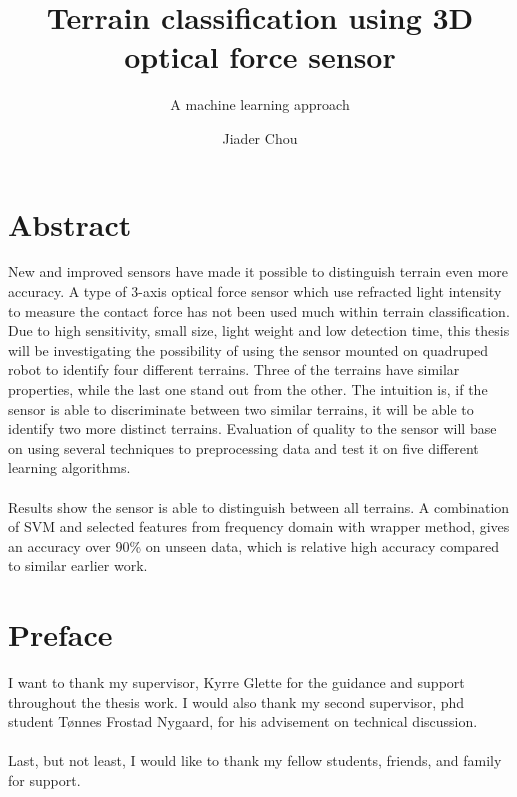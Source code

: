 \documentclass[USenglish]{ifimaster}  %
\title{Terrain classification using 3D optical force sensor}        %
\subtitle{A machine learning approach}
\author{Jiader Chou}                      %
\begin{document}
	\ififorside{}
	\frontmatter{}
	\maketitle{}
	
	\frontmatter{}
\chapter*{Abstract}                   %
New and improved sensors have made it possible to distinguish terrain even more accuracy. A type of 3-axis optical force sensor which use refracted light intensity to measure the contact force has not been used much within terrain classification. Due to high sensitivity, small size, light weight and low detection time, this thesis will be investigating the possibility of using the sensor mounted on quadruped robot to identify four different terrains. Three of the terrains have similar properties, while the last one stand out from the other. The intuition is, if the sensor is able to discriminate between two similar terrains, it will be able to identify two more distinct terrains. Evaluation of quality to the sensor will base on using several techniques to preprocessing data and test it on five different learning algorithms.
\\
\\
Results show the sensor is able to distinguish between all terrains. A combination of SVM and selected features from frequency domain with wrapper method, gives an accuracy over 90\% on unseen data, which is relative high accuracy compared to similar earlier work.
	

	
\tableofcontents{}
\listoffigures{}
\listoftables{}
	
\chapter*{Preface}                    %
I want to thank my supervisor, Kyrre Glette for the guidance and support throughout the thesis work. I would also thank my second supervisor, phd student Tønnes Frostad Nygaard, for his advisement on technical discussion.
\\
\\
Last, but not least, I would like to thank my fellow students, friends, and family for support.
	
	
\mainmatter{}
\end{document}
